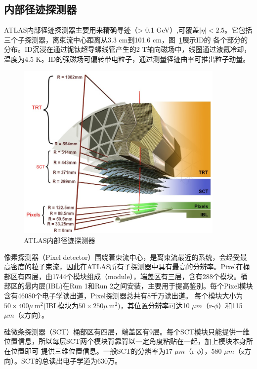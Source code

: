 \subsection{内部径迹探测器}
ATLAS内部径迹探测器主要用来精确寻迹（\pt > 0.1 GeV）,可覆盖$|\eta|<2.5$。它包括三个子探测器，离束流中心距离从3.3 cm到101.6 cm，图~\ref{fig:ATLAS_ID_sideview}展示ID的
各个部分的分布。ID沉浸在通过铌钛超导螺线管产生的2 T轴向磁场中，线圈通过液氦冷却，温度为4.5 K。ID的强磁场可偏转带电粒子，通过测量径迹曲率可推出粒子动量。
\begin{figure}[h]
\begin{center}
\includegraphics[width=0.9\textwidth]{fig/ATLAS_ID_sideview.png}
\caption{ATLAS内部径迹探测器} \label{fig:ATLAS_ID_sideview}
\end{center}
\end{figure}

像素探测器（Pixel detector）围绕着束流中心，是离束流最近的系统，会经受最高密度的粒子束流，因此在ATLAS所有子探测器中具有最高的分辨率。Pixel在桶部区有四层，由1744个模块组成（module），端盖区有三层，含有288个模块。桶部区的最内层(IBL)在Run 1和Run 2之间安装，主要用于提高\bjet 鉴别。每个Pixel模块含有46080个电子学读出道，Pixel探测器总共有8千万读出道。
每个模块大小为$50\times400 \mu ~\text{m}^{2}$(IBL模块为$50\times250 \mu ~\text{m}^{2}$)，其位置分辨率可达10 $\mu m$（r-$\phi$）和115 $\mu m$（z方向）。

硅微条探测器（SCT）桶部区有四层，端盖区有9层。每个SCT模块只能提供一维位置信息，所以每层SCT两个模块背靠背以一定角度粘贴在一起，加上模块本身所在位置即可
提供三维位置信息。一般SCT的分辨率为17 $\mu m$（r-$\phi$），580 $\mu m$（z方向）。SCT的总读出电子学道为630万。

